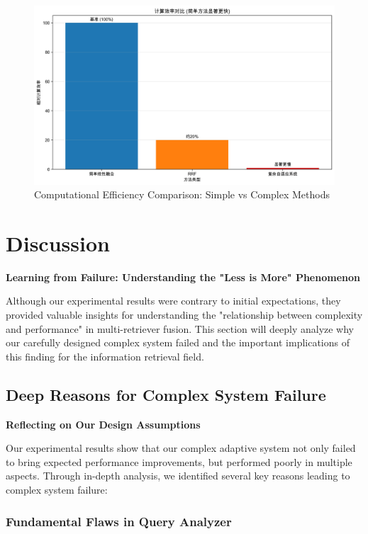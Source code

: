 \documentclass[letterpaper]{article} %
\begin{document}
\begin{figure}[t]
\centering
\includegraphics[width=0.8\columnwidth]{charts/computational_efficiency.png}
\caption{Computational Efficiency Comparison: Simple vs Complex Methods}
\label{fig:efficiency}
\end{figure}

\section{Discussion}

\textbf{Learning from Failure: Understanding the "Less is More" Phenomenon}

Although our experimental results were contrary to initial expectations, they provided valuable insights for understanding the "relationship between complexity and performance" in multi-retriever fusion. This section will deeply analyze why our carefully designed complex system failed and the important implications of this finding for the information retrieval field.

\subsection{Deep Reasons for Complex System Failure}

\textbf{Reflecting on Our Design Assumptions}

Our experimental results show that our complex adaptive system not only failed to bring expected performance improvements, but performed poorly in multiple aspects. Through in-depth analysis, we identified several key reasons leading to complex system failure:

\subsubsection{Fundamental Flaws in Query Analyzer}
\end{document}
